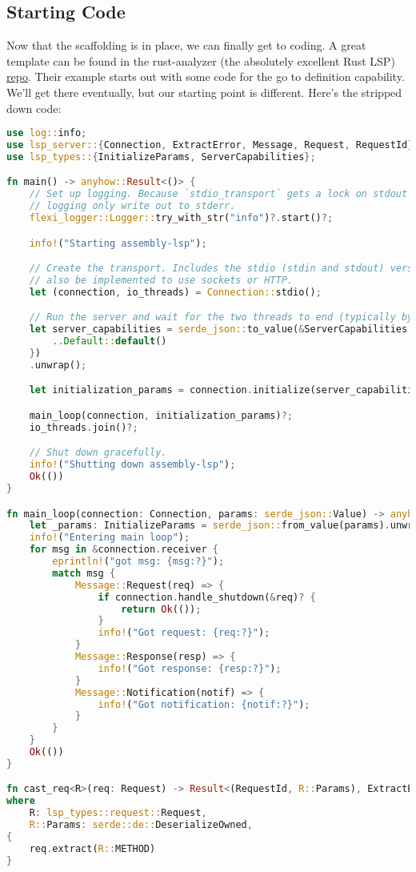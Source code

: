 \subsection{Starting Code}

Now that the scaffolding is in place, we can finally get to coding. A great template can be found in the rust-analyzer (the absolutely excellent Rust LSP) \href{https://github.com/rust-lang/rust-analyzer/tree/master/lib/lsp-server}{repo}. Their example starts out with some code for the go to definition capability. We'll get there eventually, but our starting point is different. Here's the stripped down code:

\begin{lstlisting}[language=rust]
use log::info;
use lsp_server::{Connection, ExtractError, Message, Request, RequestId};
use lsp_types::{InitializeParams, ServerCapabilities};

fn main() -> anyhow::Result<()> {
    // Set up logging. Because `stdio_transport` gets a lock on stdout and stdin, we must have our
    // logging only write out to stderr.
    flexi_logger::Logger::try_with_str("info")?.start()?;

    info!("Starting assembly-lsp");

    // Create the transport. Includes the stdio (stdin and stdout) versions but this could
    // also be implemented to use sockets or HTTP.
    let (connection, io_threads) = Connection::stdio();

    // Run the server and wait for the two threads to end (typically by trigger LSP Exit event).
    let server_capabilities = serde_json::to_value(&ServerCapabilities {
        ..Default::default()
    })
    .unwrap();

    let initialization_params = connection.initialize(server_capabilities)?;

    main_loop(connection, initialization_params)?;
    io_threads.join()?;

    // Shut down gracefully.
    info!("Shutting down assembly-lsp");
    Ok(())
}

fn main_loop(connection: Connection, params: serde_json::Value) -> anyhow::Result<()> {
    let _params: InitializeParams = serde_json::from_value(params).unwrap();
    info!("Entering main loop");
    for msg in &connection.receiver {
        eprintln!("got msg: {msg:?}");
        match msg {
            Message::Request(req) => {
                if connection.handle_shutdown(&req)? {
                    return Ok(());
                }
                info!("Got request: {req:?}");
            }
            Message::Response(resp) => {
                info!("Got response: {resp:?}");
            }
            Message::Notification(notif) => {
                info!("Got notification: {notif:?}");
            }
        }
    }
    Ok(())
}

fn cast_req<R>(req: Request) -> Result<(RequestId, R::Params), ExtractError<Request>>
where
    R: lsp_types::request::Request,
    R::Params: serde::de::DeserializeOwned,
{
    req.extract(R::METHOD)
}
\end{lstlisting}

